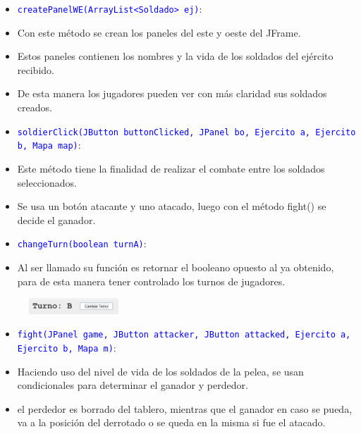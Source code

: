 \documentclass{article}
\begin{document}

\begin{itemize}
    \item \texttt{\textcolor{blue}{createPanelWE(ArrayList<Soldado> ej)}}: 
    \item Con este método se crean los paneles del este y oeste del JFrame.
    \item Estos paneles contienen los nombres y la vida de los soldados del ejército recibido.
    \item De esta manera los jugadores pueden ver con más claridad sus soldados creados.
\end{itemize}

\begin{itemize}
    \item \texttt{\textcolor{blue}{soldierClick(JButton buttonClicked, JPanel bo, Ejercito a, Ejercito b, Mapa map)}}: 
    \item Este método tiene la finalidad de realizar el combate entre los soldados seleccionados.
    \item Se usa un botón atacante y uno atacado, luego con el método fight() se decide el ganador.
\end{itemize}

\begin{itemize}
    \item \texttt{\textcolor{blue}{changeTurn(boolean turnA)}}: 
    \item Al ser llamado su función es retornar el booleano opuesto al ya obtenido, para de esta manera tener controlado los turnos de jugadores.
\end{itemize}
\begin{figure}[H]
    \centering
    \includegraphics[width=0.3\textwidth,keepaspectratio]{img/vj3.png}
    \caption{}
\end{figure}

\begin{itemize}
    \item \texttt{\textcolor{blue}{fight(JPanel game, JButton attacker, JButton attacked, Ejercito a, Ejercito b, Mapa m)}}: 
    \item Haciendo uso del nivel de vida de los soldados de la pelea, se usan condicionales para determinar el ganador y perdedor.
    \item el perdedor es borrado del tablero, mientras que el ganador en caso se pueda, va a la posición del derrotado o se queda en la misma si fue el atacado.
\end{itemize}
\end{document}
